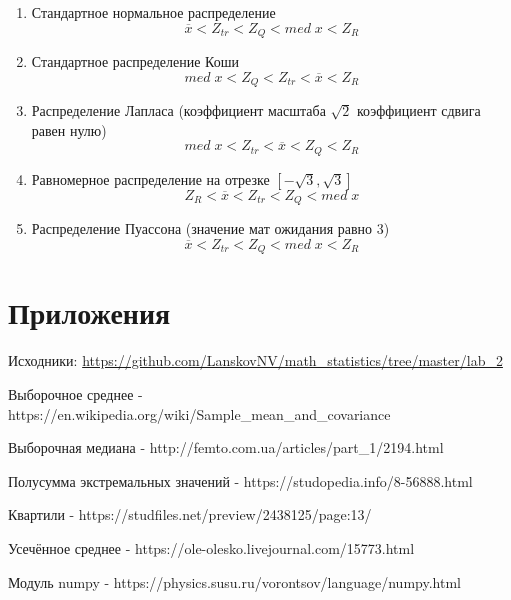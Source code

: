 \documentclass[12pt]{article}
\begin{document}
\begin{enumerate}
    \item Стандартное нормальное распределение $$\overline{x} < Z_{tr} < Z_Q < med\;x < Z_R$$
    
    \item Стандартное распределение Коши $$med\;x < Z_Q < Z_{tr} < \overline{x} < Z_R$$
    
    \item Распределение Лапласа (коэффициент масштаба $\sqrt{2}$ коэффициент сдвига равен нулю) $$med\;x < Z_{tr} < \overline{x} < Z_Q < Z_R$$
    
    \item Равномерное распределение на отрезке $\left[-\sqrt{3},\sqrt{3}\right]$ $$Z_R < \overline{x} < Z_{tr} < Z_Q < med\;x$$
    
    \item Распределение Пуассона (значение мат ожидания равно $3$) $$\overline{x} < Z_{tr} < Z_Q < med\;x < Z_R$$
    
\end{enumerate}

\section{Приложения}

Исходники: \url{https://github.com/LanskovNV/math_statistics/tree/master/lab_2}

\newpage

\begin{thebibliography}{}
    Выборочное среднее  -  https://en.wikipedia.org/wiki/Sample\_mean\_and\_covariance
    
    Выборочная медиана  -  http://femto.com.ua/articles/part\_1/2194.html
    
    Полусумма экстремальных значений  -  https://studopedia.info/8-56888.html
    
    Квартили  -  https://studfiles.net/preview/2438125/page:13/
    
      Усечённое среднее  -  https://ole-olesko.livejournal.com/15773.html
    
      Модуль numpy  -  https://physics.susu.ru/vorontsov/language/numpy.html
\end{thebibliography}
\end{document}
